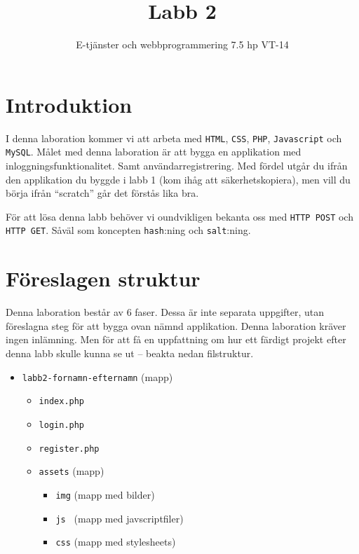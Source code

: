 \documentclass[12pt]{article}
\date{}
\title{ Labb 2 }
\author{ E-tjänster och webbprogrammering 7.5 hp VT-14 }
\begin{document}
\maketitle
\vspace{-2em}



\section{Introduktion}
I denna laboration kommer vi att arbeta med \texttt{HTML}, \texttt{CSS}, \texttt{PHP}, \texttt{Javascript} och \texttt{MySQL}. Målet med denna laboration är att bygga en applikation med inloggningsfunktionalitet. Samt användarregistrering. Med fördel utgår du ifrån den applikation du byggde i labb 1 (kom ihåg att säkerhetskopiera), men vill du börja ifrån ``scratch'' går det förstås lika bra.

För att lösa denna labb behöver vi oundvikligen bekanta oss med \texttt{HTTP POST} och \texttt{HTTP GET}. Såväl som koncepten \texttt{hash}:ning och \texttt{salt}:ning.



\section{Föreslagen struktur}
Denna laboration består av 6 faser. Dessa är inte separata uppgifter, utan föreslagna steg för att bygga ovan nämnd applikation. Denna laboration kräver ingen inlämning. Men för att få en uppfattning om hur ett färdigt projekt efter denna labb skulle kunna se ut -- beakta nedan filstruktur.
  \begin{itemize}
    \item \texttt{labb2-fornamn-efternamn} (mapp)
      \begin{itemize}
        \item \texttt{index.php}
        \item \texttt{login.php}
        \item \texttt{register.php}
        \item \texttt{assets} (mapp)
      \begin{itemize}
        \item \texttt{img} (mapp med bilder)
        \item \texttt{js } (mapp med javscriptfiler)
	      \item \texttt{css} (mapp med stylesheets)
      \end{itemize}
    \end{itemize}
  \end{itemize}
\end{document}

